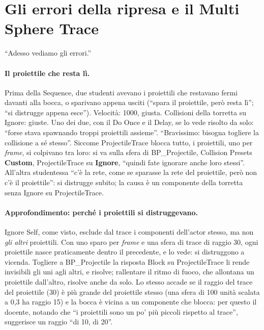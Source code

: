 \section{Gli errori della ripresa e il Multi Sphere Trace}
\label{ue5:sec:errori}

``Adesso vediamo gli errori.''

\paragraph{Il proiettile che resta lì.} Prima della Sequence, due studenti avevano i
proiettili che restavano fermi davanti alla bocca, o sparivano appena usciti (``spara il
proiettile, però resta lì''; ``si distrugge appena esce''). Velocità: 1000, giusta.
Collisioni della torretta su Ignore: giuste. Uno dei due, con il Do Once e il Delay, se
lo vede risolto da solo: ``forse stava spawnando troppi proiettili assieme''. ``Bravissimo:
bisogna togliere la collisione a sé stesso''. Siccome ProjectileTrace blocca tutto, i
proiettili, uno per \emph{frame}, si colpivano tra loro: si va sulla sfera di
BP\_Projectile, Collision Presets \textbf{Custom}, ProjectileTrace su \textbf{Ignore},
``quindi fate ignorare anche loro stessi''. All'altra studentessa ``c'è la rete, come
se sparasse la rete del proiettile, però non c'è il proiettile'': si distrugge subito;
la causa è un componente della torretta senza Ignore su ProjectileTrace.

\paragraph{Approfondimento: perché i proiettili si distruggevano.} Ignore Self, come
visto, esclude dal trace i componenti dell'actor stesso, ma non \emph{gli altri}
proiettili. Con uno sparo per \emph{frame} e una sfera di trace di raggio 30, ogni
proiettile nasce praticamente dentro il precedente, e lo vede: si distruggono a vicenda.
Togliere a BP\_Projectile la risposta Block su ProjectileTrace li rende invisibili gli
uni agli altri, e risolve; rallentare il ritmo di fuoco, che allontana un proiettile
dall'altro, risolve anche da solo. Lo stesso accade se il raggio del trace del
proiettile (30) è più grande del proiettile stesso (una sfera di 100 unità scalata a 0,3
ha raggio 15) e la bocca è vicina a un componente che blocca: per questo il docente,
notando che ``i proiettili sono un po' più piccoli rispetto al trace'', suggerisce un
raggio ``di 10, di 20''.

